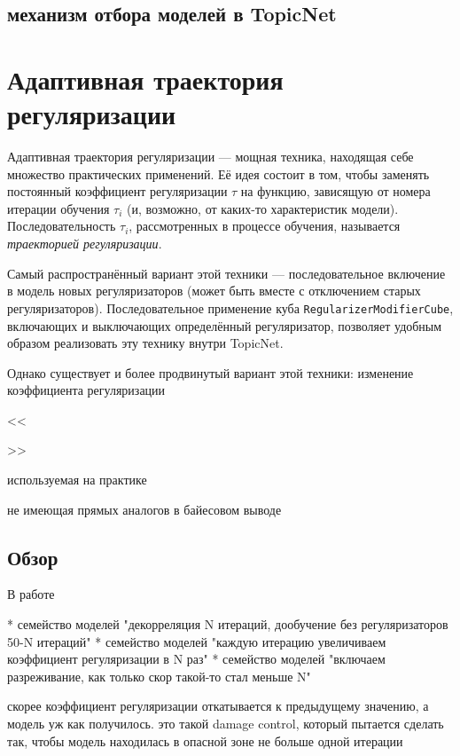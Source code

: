 \subsection{механизм отбора моделей в TopicNet}


\section{Адаптивная траектория регуляризации}

Адаптивная траектория регуляризации --- мощная техника, находящая себе множество практических применений. Её идея состоит в том, чтобы заменять постоянный коэффициент регуляризации $\tau$ на функцию, зависящую от номера итерации обучения $\tau_i$ (и, возможно, от каких-то характеристик модели). Последовательность $\tau_i$, рассмотренных в процессе обучения, называется \textit{траекторией регуляризации}.

Самый распространённый вариант этой техники --- последовательное включение в модель новых регуляризаторов (может быть вместе с отключением старых регуляризаторов). Последовательное применение куба \texttt{RegularizerModifierCube}, включающих и выключающих определённый регуляризатор, позволяет удобным образом реализовать эту технику внутри TopicNet.

Однако существует и более продвинутый вариант этой техники: изменение коэффициента регуляризации

<<

>>

используемая на практике

не имеющая прямых аналогов в байесовом выводе


\subsection{Обзор}


В работе \cite{plavin}


\cite{ianina2019regularized}
\cite{popov_hier}

* семейство моделей "декорреляция N итераций, дообучение без регуляризаторов 50-N итераций"
* семейство моделей "каждую итерацию увеличиваем коэффициент регуляризации в N раз"
* семейство моделей "включаем разреживание, как только скор такой-то стал меньше N"

скорее коэффициент регуляризации откатывается к предыдущему значению, а модель уж как получилось.
это такой damage control, который пытается сделать так, чтобы модель находилась в опасной зоне не больше одной итерации





